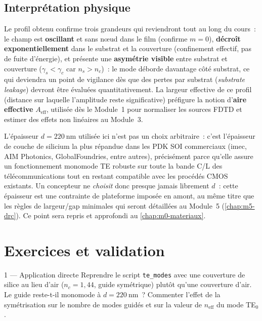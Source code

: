 \subsection{Interprétation physique}

Le profil obtenu confirme trois grandeurs qui reviendront tout au long du
cours~: le champ est \textbf{oscillant} et sans nœud dans le film (confirme
$m=0$), \textbf{décroît exponentiellement} dans le substrat et la
couverture (confinement effectif, pas de fuite d'énergie), et présente une
\textbf{asymétrie visible} entre substrat et couverture ($\gamma_s <
\gamma_c$ car $n_s > n_c$)~: le mode \og déborde\fg{} davantage côté
substrat, ce qui deviendra un point de vigilance dès que des pertes par
substrat (\emph{substrate leakage}) devront être évaluées quantitativement.
La largeur effective de ce profil (distance sur laquelle l'amplitude reste
significative) préfigure la notion d'\textbf{aire effective} $A_{\text{eff}}$,
utilisée dès le Module~1 pour normaliser les sources FDTD et estimer des
effets non linéaires au Module~3.

\begin{flotfonderie}
L'épaisseur $d=\SI{220}{\nano\metre}$ utilisée ici n'est pas un choix
arbitraire~: c'est l'épaisseur de couche de silicium la plus répandue dans
les PDK SOI commerciaux (imec, AIM Photonics, GlobalFoundries, entre
autres), précisément parce qu'elle assure un fonctionnement monomode TE
robuste sur toute la bande C/L des télécommunications tout en restant
compatible avec les procédés CMOS existants. Un concepteur ne \emph{choisit}
donc presque jamais librement $d$~: cette épaisseur est une contrainte de
plateforme imposée en amont, au même titre que les règles de largeur/gap
minimales qui seront détaillées au Module~5 (\cref{chap:m5-drc}). Ce point
sera repris et approfondi au \cref{chap:m0-materiaux}.
\end{flotfonderie}

\section{Exercices et validation}

\begin{exercice}{1 — Application directe}
Reprendre le script \texttt{te\_modes} avec une couverture de silice au
lieu d'air ($n_c = 1{,}44$, guide symétrique) plutôt qu'une couverture
d'air. Le guide reste-t-il monomode à $d=\SI{220}{\nano\metre}$~? Commenter
l'effet de la symétrisation sur le nombre de modes guidés et sur la valeur
de $n_{\text{eff}}$ du mode TE$_0$.
\end{exercice}

